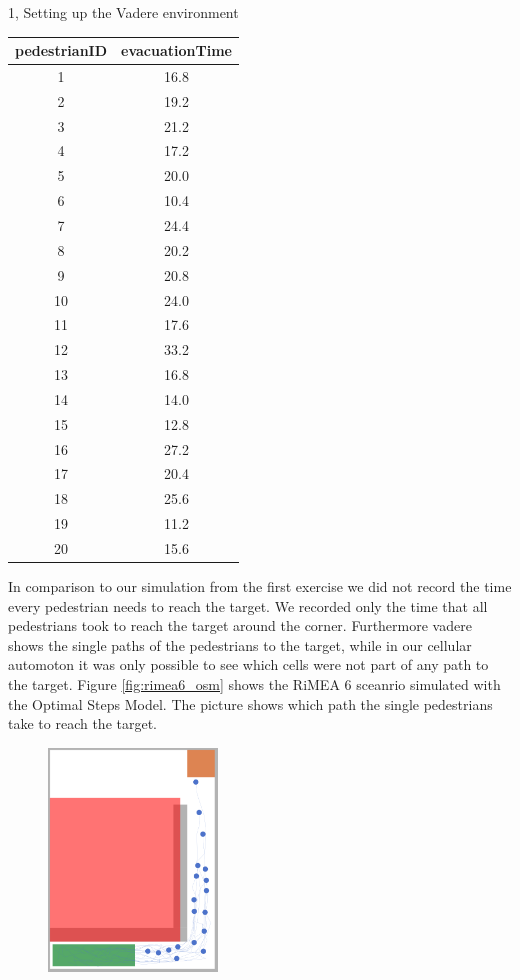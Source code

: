 \documentclass[10pt,a4paper]{article}
\begin{document}
\begin{task}{1, Setting up the Vadere environment}
\begin{itemize}
    \bigbreak
    \begin{tabular}{c|c}
    pedestrianID& evacuationTime\\
    \hline
    1& 16.8  \\
    2& 19.2 \\
    3& 21.2\\
    4&17.2\\
    5&20.0\\
    6&10.4\\
    7&24.4\\
    8&20.2\\
    9&20.8\\
    10&24.0\\
    11&17.6\\
    12&33.2\\
    13&16.8\\
    14&14.0\\
    15&12.8\\
    16&27.2\\
    17&20.4\\
    18&25.6\\
    19&11.2\\
    20&15.6\\
    \end{tabular}
    \bigbreak
    In comparison to our simulation from the first exercise we did not record the time every pedestrian needs to reach the target. We recorded only the time that all pedestrians took to reach the target around the corner. Furthermore vadere shows the single paths of the pedestrians to the target, while in our cellular automoton it was only possible to see which cells were not part of any path to the target. Figure \ref{fig:rimea6_osm} shows the RiMEA 6 sceanrio simulated with the Optimal Steps Model. The picture shows which path the single pedestrians take to reach the target.
    \begin{figure}[H]
        \centering
        \includegraphics[width=0.4\textwidth]{pictures/osm/rimeatest6.png}

\end{figure}
\end{itemize}
\end{task}
\end{document}
